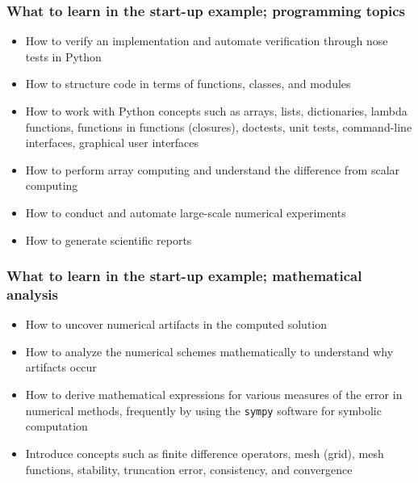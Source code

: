 \documentclass{beamer}
\begin{document}
\begin{frame}
\frametitle{What to learn in the start-up example; programming topics}

\begin{itemize}
 \item How to verify an implementation and automate verification
   through nose tests in Python

 \item How to structure code in terms of functions, classes, and modules

 \item How to work with Python concepts such as arrays, lists, dictionaries,
   lambda functions, functions in functions (closures), doctests,
   unit tests, command-line interfaces, graphical user interfaces

 \item How to perform array computing and understand the difference from
   scalar computing

 \item How to conduct and automate large-scale numerical experiments

 \item How to generate scientific reports
\end{itemize}

\noindent
\end{frame}

\begin{frame}
\frametitle{What to learn in the start-up example; mathematical analysis}

\begin{itemize}
 \item How to uncover numerical artifacts in the computed solution

 \item How to analyze the numerical schemes mathematically to understand
   why artifacts occur

 \item How to derive mathematical expressions for various measures of
   the error in numerical methods, frequently by using the \texttt{sympy} software
   for symbolic computation

 \item Introduce concepts such as finite difference operators,
   mesh (grid), mesh functions,
   stability, truncation error, consistency, and convergence
\end{itemize}

\noindent
\end{frame}
\end{document}
